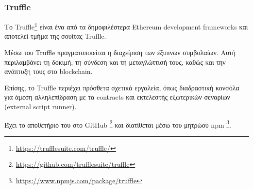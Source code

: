 \subsubsection{Truffle} \label{subsection:4-2-3-1-truffle}


Το Truffle\footnote{\url{https://trufflesuite.com/truffle/}} είναι ένα από τα δημοφιλέστερα Ethereum development frameworks και αποτελεί τμήμα της σουίτας Truffle.

Μέσω του Truffle πραγματοποιείται η διαχείριση των έξυπνων συμβολαίων. Αυτή περιλαμβάνει τη δοκιμή, τη σύνδεση και τη μεταγλώττισή τους, καθώς και την ανάπτυξη τους στο blockchain.

Επίσης, το Truffle περιέχει πρόσθετα σχετικά εργαλεία, όπως διαδραστική κονσόλα για άμεση αλληλεπίδραση με τα contracts  και εκτελεστής εξωτερικών σεναρίων (external script runner). 

Έχει το αποθετήριό του στο GitHub \footnote{\url{https://github.com/trufflesuite/truffle}} και διατίθεται μέσω του μητρώου npm \footnote{\url{https://www.npmjs.com/package/truffle}}.
